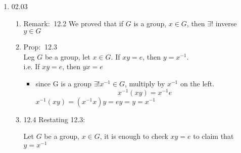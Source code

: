 \documentclass[12pt]{article}
\newcommand{\defi}{{\color{blue} Definition: $\ $}}
\newcommand{\prop}{{\color{blue} Prop: $\ $}}
\newcommand{\rem}{{\color{blue} Remark: $\ $}}
\begin{document}
\begin{enumerate}
\begin{enumerate}
        \item \rem 11.3
        
        Let $(G,*)$ be a group then $(G,*)$ is a subgroup of itself.

        \item \defi 11.4
        
        Proper subgroup of $G$ is a subgroup $H$ s.t. $H\ne G$
    \end{enumerate}

    \item 02.03
    \begin{enumerate}
        \item \rem 12.2 We proved that if $G$ is a group, $x\in G$, then $\exists !$ inverse $y \in G$
        \item \prop 12.3 \\
        Leg $G$ be a group, let $x \in G$. If $xy = e$, then $y = x^{-1}$.\\ i.e. If $xy = e$, then $yx = e$
        \begin{itemize}
            \item since G is a group $\exists ! x^{-1}\in G$, multiply by $x^{-1}$ on the left. $$x^{-1}(xy) = x^{-1}e$$
            $x^{-1}(xy) = (x^{-1}x)y = ey = y = x^{-1}$
        \end{itemize} 

        \item 12.4 Restating 12.3: 
        
        Let $G$ be a group, $x\in G$, it is enough to check $xy=e$ to claim that $y = x^{-1}$


\end{enumerate}
\end{enumerate}
\end{document}
